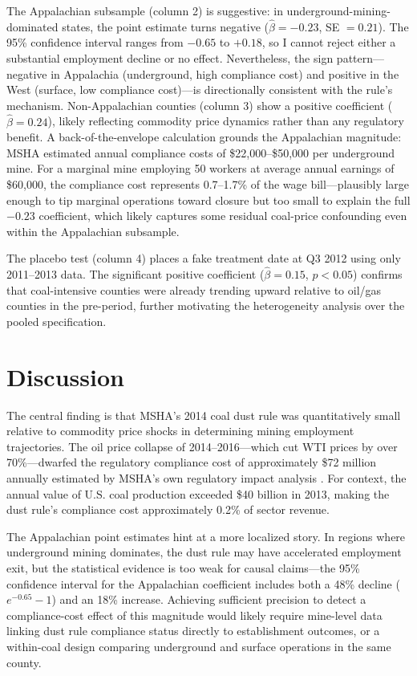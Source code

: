 \documentclass[12pt]{article}
\begin{document}


The Appalachian subsample (column 2) is suggestive: in underground-mining-dominated states, the point estimate turns negative ($\hat{\beta} = -0.23$, SE $= 0.21$). The 95\% confidence interval ranges from $-0.65$ to $+0.18$, so I cannot reject either a substantial employment decline or no effect. Nevertheless, the sign pattern---negative in Appalachia (underground, high compliance cost) and positive in the West (surface, low compliance cost)---is directionally consistent with the rule's mechanism. Non-Appalachian counties (column 3) show a positive coefficient ($\hat{\beta} = 0.24$), likely reflecting commodity price dynamics rather than any regulatory benefit. A back-of-the-envelope calculation grounds the Appalachian magnitude: MSHA estimated annual compliance costs of \$22,000--\$50,000 per underground mine. For a marginal mine employing 50 workers at average annual earnings of \$60,000, the compliance cost represents 0.7--1.7\% of the wage bill---plausibly large enough to tip marginal operations toward closure but too small to explain the full $-0.23$ coefficient, which likely captures some residual coal-price confounding even within the Appalachian subsample.

The placebo test (column 4) places a fake treatment date at Q3 2012 using only 2011--2013 data. The significant positive coefficient ($\hat{\beta} = 0.15$, $p < 0.05$) confirms that coal-intensive counties were already trending upward relative to oil/gas counties in the pre-period, further motivating the heterogeneity analysis over the pooled specification.


\section{Discussion}
\label{sec:discussion}

The central finding is that MSHA's 2014 coal dust rule was quantitatively small relative to commodity price shocks in determining mining employment trajectories. The oil price collapse of 2014--2016---which cut WTI prices by over 70\%---dwarfed the regulatory compliance cost of approximately \$72 million annually estimated by MSHA's own regulatory impact analysis \citep{msha2014ria}. For context, the annual value of U.S. coal production exceeded \$40 billion in 2013, making the dust rule's compliance cost approximately 0.2\% of sector revenue.

The Appalachian point estimates hint at a more localized story. In regions where underground mining dominates, the dust rule may have accelerated employment exit, but the statistical evidence is too weak for causal claims---the 95\% confidence interval for the Appalachian coefficient includes both a 48\% decline ($e^{-0.65} - 1$) and an 18\% increase. Achieving sufficient precision to detect a compliance-cost effect of this magnitude would likely require mine-level data linking dust rule compliance status directly to establishment outcomes, or a within-coal design comparing underground and surface operations in the same county.
\end{document}
